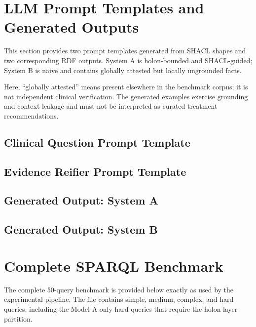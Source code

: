 \documentclass[10pt,a4paper]{article}
\newcommand{\artifact}[2]{%
  }
\begin{document}
\section{LLM Prompt Templates and Generated Outputs}
\label{sec:prompts}
This section provides two prompt templates generated from SHACL shapes and two corresponding RDF outputs. System A is holon-bounded and SHACL-guided; System B is naive and contains globally attested but locally ungrounded facts.

Here, ``globally attested'' means present elsewhere in the benchmark corpus; it is not independent clinical verification. The generated examples exercise grounding and context leakage and must not be interpreted as curated treatment recommendations.

\subsection{Clinical Question Prompt Template}
\artifact{prompts/oe_ClinicalQuestionShape.txt}{SHACL-derived prompt template for clinical-question holons.}
\subsection{Evidence Reifier Prompt Template}
\artifact{prompts/oe_EvidenceReifierShape.txt}{SHACL-derived prompt template for evidence reifiers.}
\subsection{Generated Output: System A}
\artifact{generated_outputs/q_asthma_efficacy_systemA.ttl}{Generated RDF output for q\_asthma\_efficacy under System A.}
\subsection{Generated Output: System B}
\artifact{generated_outputs/q_asthma_efficacy_systemB.ttl}{Generated RDF output for q\_asthma\_efficacy under System B, including Type-A ungrounded additions.}

\section{Complete SPARQL Benchmark}
\label{sec:sparql}
The complete 50-query benchmark is provided below exactly as used by the experimental pipeline. The file contains simple, medium, complex, and hard queries, including the Model-A-only hard queries that require the holon layer partition.
\artifact{benchmark_queries.py}{Complete 50-query SPARQL benchmark with Model A and Model B variants.}
\end{document}
